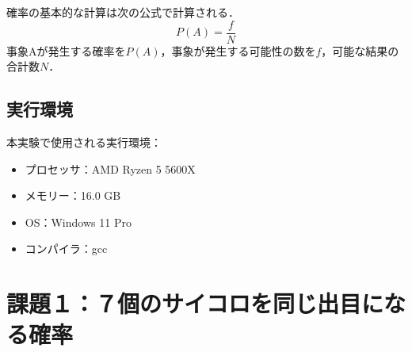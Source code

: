 \documentclass[a4j, titlepage]{jarticle}
\begin{document}
  確率の基本的な計算は次の公式で計算される．
  \begin{equation}
    P(A) = \frac{f}{N}
  \end{equation}
  事象Aが発生する確率を$P(A)$，事象が発生する可能性の数を$f$，可能な結果の合計数$N$．

  \subsection{実行環境}
    本実験で使用される実行環境：
    \begin{screen}
        \begin{itemize}
            \item プロセッサ：AMD Ryzen 5 5600X
            \item メモリー：16.0 GB
            \item OS：Windows 11 Pro
            \item コンパイラ：gcc
        \end{itemize}    
    \end{screen}

\section{課題１：７個のサイコロを同じ出目になる確率}
\end{document}
